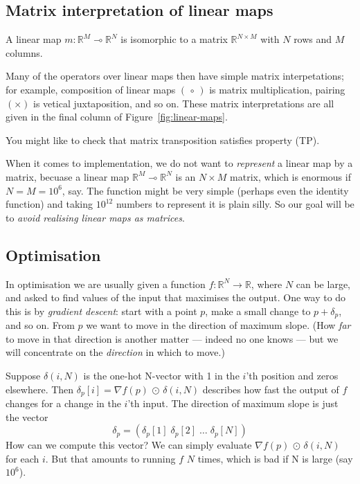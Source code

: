 \documentclass[sigplan,review]{acmart}
\renewcommand{\to}{\rightarrow}    %
\newcommand{\linto}{\multimap}     %
\newcommand{\gradf}[1]{\nabla\! #1}  %
\newcommand{\deltafun}[2]{\delta(#1,#2)}
\renewcommand{\d}[1]{\delta_{\mathit{#1}}}   %
\newcommand{\tcolon}{\!:\!}
\newcommand{\real}{\mathbb{R}}       %
\newcommand{\lmcomp}{\,\circ\,}   %
\newcommand{\lmpair}{\times}         %
\newcommand{\lmapply}{\,\odot\,}      %
\begin{document}
\subsection{Matrix interpretation of linear maps} \label{sec:matrix-rep}

A linear map $m \tcolon \real^M \linto \real^N$ is isomorphic to a matrix $\real^{N \times M}$ with $N$ rows and $M$ columns.

Many of the operators over linear maps then have simple matrix interpetations; for example, composition of
linear maps $(\lmcomp)$ is matrix multiplication, pairing $(\lmpair)$ is vetical juxtaposition, and so on.
These matrix interpretations are all given in the final column of Figure~\ref{fig:linear-maps}.

You might like to check that matrix transposition satisfies property (TP).

When it comes to implementation, we do not want to \emph{represent} a linear map by a matrix,
becuase a linear map $\real^M \linto \real^N$ is an $N \times M$ matrix, which is
enormous if $N = M = 10^6$, say.  The function might be very simple (perhaps even the identity
function) and taking $10^{12}$ numbers to represent it is plain silly.  So our goal will be
to \emph{avoid realising linear maps as matrices}.

\subsection{Optimisation}

In optimisation we are usually given a function $f : \real^N \to \real$, where $N$ can be large,
and asked to
find values of the input that maximises the output.  One way to do this is by \emph{gradient descent}:
start with a point $p$, make a small change to $p+\d{p}$, and so on.  From $p$ we want
to move in the direction of maximum slope.  (How \emph{far} to move in that
direction is another matter --- indeed no one knows ---
but we will concentrate on the \emph{direction} in which to move.)

Suppose $\deltafun i N$ is the one-hot N-vector with 1 in the $i$'th position and zeros elsewhere.
Then $\d{p}[i] = \gradf{f}(p) \lmapply \deltafun i N$ describes how fast the output of $f$ changes
for a change in the $i$'th input.  The direction of maximum slope is just the vector
$$\d{p} = (\d{p}[1]\; \d{p}[2] \; \ldots \; \d{p}[N])$$
How can we compute this vector?  We can simply evaluate $\gradf{f}(p) \lmapply \deltafun i N$ for each $i$.
But that amounts to running $f$ $N$ times, which is bad if N is large (say $10^6$).
\end{document}
